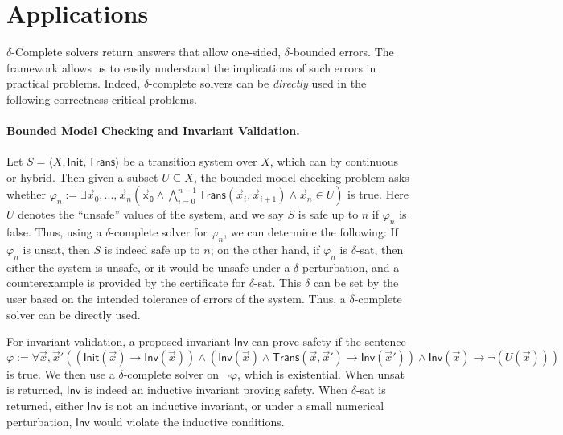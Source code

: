 \documentclass[prodmode]{acmsmall} %
\begin{document}
\section{Applications}\label{app}
$\delta$-Complete solvers return answers that allow one-sided, $\delta$-bounded errors. The framework allows us to easily understand the implications of such errors in practical problems. Indeed, $\delta$-complete solvers can be {\em directly} used in the following correctness-critical problems. 
\paragraph{Bounded Model Checking and Invariant Validation.} Let $S=\langle X, \mathsf{Init}, \mathsf{Trans}\rangle$ be a transition system over $X$, which can by continuous or hybrid. Then given a subset $U\subseteq X$, the bounded model checking problem asks whether $\varphi_n:= \exists \vec x_0,...,\vec x_n(\mathsf{\vec x_0}\wedge \bigwedge_{i=0}^{n-1} \mathsf{Trans}(\vec x_i, \vec x_{i+1}) \wedge \vec x_n\in U)$ is true. Here $U$ denotes the ``unsafe'' values of the system, and we say $S$ is safe up to $n$ if $\varphi_n$ is false. Thus, using a $\delta$-complete solver for $\varphi_n$, we can determine the following: If $\varphi_n$ is {\sf unsat}, then $S$ is indeed safe up to $n$; on the other hand, if $\varphi_n$ is {\sf $\delta$-sat}, then either the system is unsafe, or it would be unsafe under a $\delta$-perturbation, and a counterexample is provided by the certificate for {\sf $\delta$-sat}. This $\delta$ can be set by the user based on the intended tolerance of errors of the system. Thus, a $\delta$-complete solver can be directly used. 

For invariant validation, a proposed invariant $\mathsf{Inv}$ can prove safety if the sentence $\varphi:=\forall\vec x,\vec x'((\mathsf{Init}(\vec x)\rightarrow \mathsf{Inv}(\vec x))\wedge (\mathsf{Inv}(\vec x)\wedge\mathsf{Trans}(\vec x, \vec x')\rightarrow\mathsf{Inv}(\vec x'))\wedge \mathsf{Inv}(\vec x)\rightarrow \neg(U(\vec x)))$ is true. We then use a $\delta$-complete solver on $\neg\varphi$, which is existential. When {\sf unsat} is returned, $\mathsf{Inv}$ is indeed an inductive invariant proving safety. When {\sf $\delta$-sat} is returned, either $\mathsf{Inv}$ is not an inductive invariant, or under a small numerical perturbation, $\mathsf{Inv}$ would violate the inductive conditions.
\end{document}
